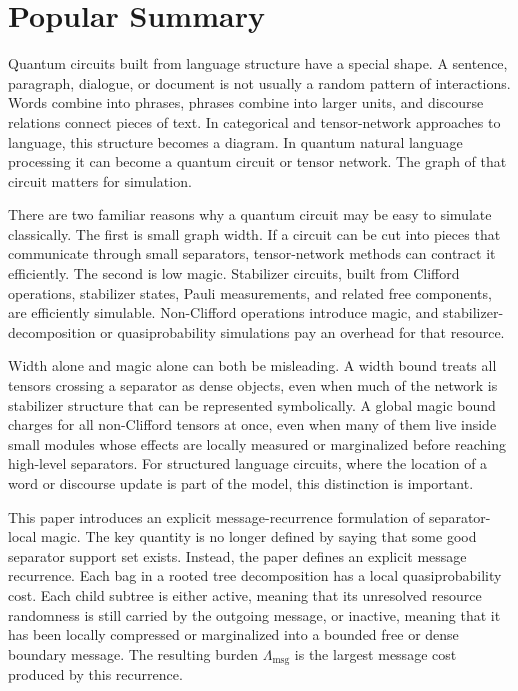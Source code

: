 \section*{Popular Summary}

Quantum circuits built from language structure have a special shape. A sentence, paragraph, dialogue, or document is not usually a random pattern of interactions. Words combine into phrases, phrases combine into larger units, and discourse relations connect pieces of text. In categorical and tensor-network approaches to language, this structure becomes a diagram. In quantum natural language processing it can become a quantum circuit or tensor network. The graph of that circuit matters for simulation.

There are two familiar reasons why a quantum circuit may be easy to simulate classically. The first is small graph width. If a circuit can be cut into pieces that communicate through small separators, tensor-network methods can contract it efficiently. The second is low magic. Stabilizer circuits, built from Clifford operations, stabilizer states, Pauli measurements, and related free components, are efficiently simulable. Non-Clifford operations introduce magic, and stabilizer-decomposition or quasiprobability simulations pay an overhead for that resource.

Width alone and magic alone can both be misleading. A width bound treats all tensors crossing a separator as dense objects, even when much of the network is stabilizer structure that can be represented symbolically. A global magic bound charges for all non-Clifford tensors at once, even when many of them live inside small modules whose effects are locally measured or marginalized before reaching high-level separators. For structured language circuits, where the location of a word or discourse update is part of the model, this distinction is important.

This paper introduces an explicit message-recurrence formulation of separator-local magic. The key quantity is no longer defined by saying that some good separator support set exists. Instead, the paper defines an explicit message recurrence. Each bag in a rooted tree decomposition has a local quasiprobability cost. Each child subtree is either active, meaning that its unresolved resource randomness is still carried by the outgoing message, or inactive, meaning that it has been locally compressed or marginalized into a bounded free or dense boundary message. The resulting burden \(\Lambda_{\mathrm{msg}}\) is the largest message cost produced by this recurrence.

